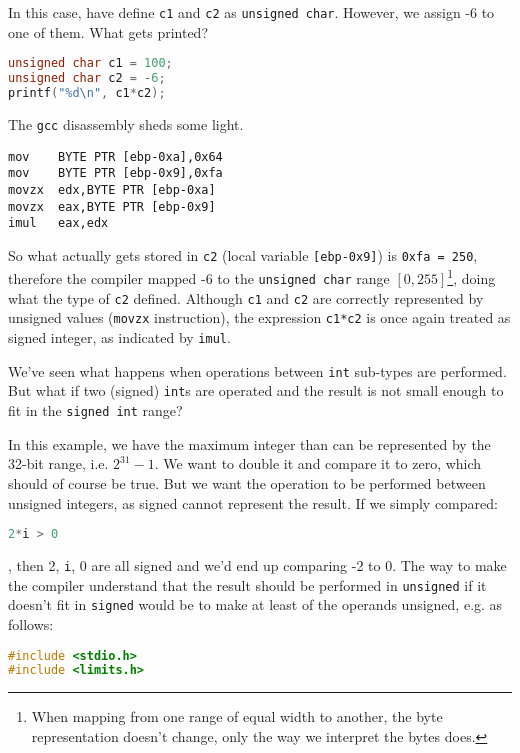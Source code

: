 \begin{exmp}
In this case, have define \texttt{c1} and \texttt{c2} as \texttt{unsigned char}. However, we assign -6 to one of them. What gets printed?
\begin{lstlisting}[language=c]
unsigned char c1 = 100;
unsigned char c2 = -6;
printf("%d\n", c1*c2);
\end{lstlisting}
The \texttt{gcc} disassembly sheds some light.
\begin{lstlisting}
mov    BYTE PTR [ebp-0xa],0x64
mov    BYTE PTR [ebp-0x9],0xfa
movzx  edx,BYTE PTR [ebp-0xa]
movzx  eax,BYTE PTR [ebp-0x9]
imul   eax,edx
\end{lstlisting}
So what actually gets stored in \texttt{c2} (local variable \texttt{[ebp-0x9]}) is \texttt{0xfa = 250}, therefore the compiler mapped -6 to the \texttt{unsigned char} range  $[0, 255]$\footnote{When mapping from one range of equal width to another, the byte representation doesn't change, only the way we interpret the bytes does.}, doing what the type of \texttt{c2} defined. Although \texttt{c1} and \texttt{c2} are correctly represented by unsigned values (\texttt{movzx} instruction), the expression \texttt{c1*c2} is once again treated as signed integer, as indicated by \texttt{imul}. \qedblack

We've seen what happens when operations between \texttt{int} sub-types are performed. But what if two (signed) \texttt{int}s are operated and the result is not small enough to fit in the \texttt{signed int} range?
\begin{exmp}

In this example, we have the maximum integer than can be represented by the 32-bit range, i.e. $2^{31}-1$. We want to double it and compare it to zero, which should of course be true. But we want the operation to be performed between unsigned integers, as signed cannot represent the result. If we simply compared:
\begin{lstlisting}[language=c]
2*i > 0
\end{lstlisting}
, then 2, \texttt{i}, 0 are all signed and we'd end up comparing -2 to 0. The way to make the compiler understand that the result should be performed in \texttt{unsigned} if it doesn't fit in \texttt{signed} would be to make at least of the operands unsigned, e.g. as follows: 
\begin{lstlisting}[language=c]
#include <stdio.h>
#include <limits.h>


\end{lstlisting}
\end{exmp}
\end{exmp}
